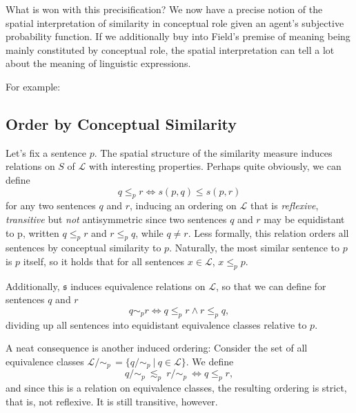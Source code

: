 \documentclass[11pt, a4paper]{article}
\renewcommand{\i}[1]{\emph{#1}}
\newcommand{\given}[1][]{\:#1\vert\:}
\begin{document}
What is won with this precisification? We now have a precise notion of the spatial interpretation of similarity in conceptual role given an agent's subjective probability function. If we additionally buy into Field's premise of meaning being mainly constituted by conceptual role, the spatial interpretation can tell a lot about the meaning of linguistic expressions. 

For example:

\subsection{Order by Conceptual Similarity}

Let's fix a sentence $p$. The spatial structure of the similarity measure induces relations on $S$ of $\mathcal{L}$ with interesting properties. Perhaps quite obviously, we can define 
\[
    q \leqslant_p r \Leftrightarrow s(p,q) \leqslant s(p,r)
\]
for any two sentences $q$ and $r$, inducing an ordering on $\mathcal{L}$ that is \i{reflexive}, \i{transitive} but \i{not} antisymmetric since two sentences $q$ and $r$ may be equidistant to p, written $q \leqslant_p r$ and $r \leqslant_p q$, while $q \not = r$. Less formally, this relation orders all sentences by conceptual similarity to $p$. Naturally, the most similar sentence to $p$ is $p$ itself, so it holds that for all sentences ${x \in \mathcal{L}}$, ${x\leqslant_p p}$.

Additionally, $\mathfrak{s}$ induces equivalence relations on $\mathcal{L}$, so that we can define for sentences $q$ and $r$ 
\[
    q \sim_p r \Leftrightarrow q \leqslant_p r \land r \leqslant_p q,
\]
dividing up all sentences into equidistant equivalence classes relative to $p$.

A neat consequence is another induced ordering: Consider the set of all equivalence classes $\mathcal{L}/\!\sim_p\,=\{ q/\!\sim_p \given q\in \mathcal{L} \}$. We define   
\[
    q/\!\sim_p~\lesssim_p~r/\!\sim_p~\Leftrightarrow q \leqslant_p r, 
\]
and since this is a relation on equivalence classes, the resulting ordering is strict, that is, not reflexive. It is still transitive, however.
\end{document}
